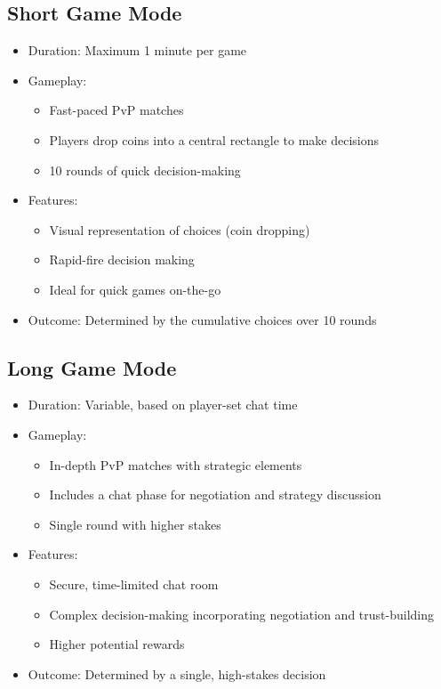 \documentclass[]{article}
\begin{document}
\subsection{Short Game Mode}

\begin{itemize}
\item Duration: Maximum 1 minute per game
\item Gameplay:
  \begin{itemize}
  \item Fast-paced PvP matches
  \item Players drop coins into a central rectangle to make decisions
  \item 10 rounds of quick decision-making
  \end{itemize}
\item Features:
  \begin{itemize}
  \item Visual representation of choices (coin dropping)
  \item Rapid-fire decision making
  \item Ideal for quick games on-the-go
  \end{itemize}
\item Outcome: Determined by the cumulative choices over 10 rounds
\end{itemize}

\subsection{Long Game Mode}

\begin{itemize}
\item Duration: Variable, based on player-set chat time
\item Gameplay:
  \begin{itemize}
  \item In-depth PvP matches with strategic elements
  \item Includes a chat phase for negotiation and strategy discussion
  \item Single round with higher stakes
  \end{itemize}
\item Features:
  \begin{itemize}
  \item Secure, time-limited chat room
  \item Complex decision-making incorporating negotiation and trust-building
  \item Higher potential rewards
  \end{itemize}
\item Outcome: Determined by a single, high-stakes decision
\end{itemize}
\end{document}

